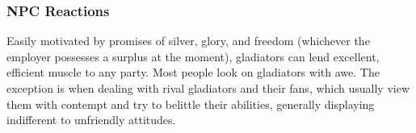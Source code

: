 \subsubsection{NPC Reactions}
Easily motivated by promises of silver, glory, and freedom (whichever the employer possesses a surplus at the moment), gladiators can lend excellent, efficient muscle to any party. Most people look on gladiators with awe. The exception is when dealing with rival gladiators and their fans, which usually view them with contempt and try to belittle their abilities, generally displaying indifferent to unfriendly attitudes.




